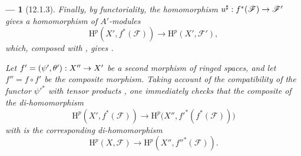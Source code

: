 \documentclass[oneside]{amsart}
\theoremstyle{ega-env-style}
\newtheorem*{env}{---}
\theoremstyle{ega-thm-env-style}
\theoremstyle{ega-defn-env-style}
\def\mathcal{\mathscr}
\def\sh{\mathcal}                   %
\def\HH{\mathrm{H}}                 %
\renewcommand{\to}{\mathchoice{\longrightarrow}{\rightarrow}{\rightarrow}{\rightarrow}}
\begin{document}
\begin{env}[12.1.3]
Finally, by functoriality, the homomorphism
$u^\sharp:f^*(\sh{F})\to\sh{F}'$ gives a homomorphism of
$A'$-modules
\[
  \HH^p(X',f^*(\sh{F}))
  \longrightarrow
  \HH^p(X',\sh{F}'),
\]
which, composed with , gives
.

Let $f'=(\psi',\theta'):X''\to X'$ be a second morphism of ringed
spaces, and let $f''=f\circ f'$ be the composite morphism.
Taking account of the compatibility of the functor $\psi'^*$ with
tensor products , one immediately
checks that the composite of the di-homomorphism
\[
  \HH^p(X',f^*(\sh{F}))
  \longrightarrow
  \HH^p\bigl(X'',f'^*(f^*(\sh{F}))\bigr)
\]
with  is the corresponding di-homomorphism
\[
  \HH^p(X,\sh{F})
  \longrightarrow
  \HH^p(X'',f''^*(\sh{F})).
\]
\end{env}
\end{document}
